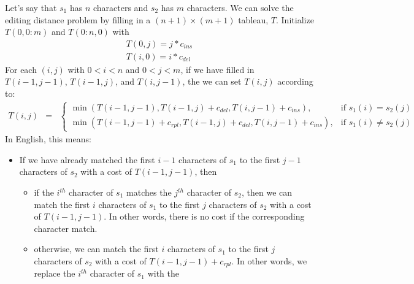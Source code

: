 \documentclass{article}
\begin{document}
\begin{enumerate}
          Let's say that $s_1$ has $n$ characters and $s_2$ has $m$ characters.
          We can solve the editing distance problem by filling in a $(n+1) \times (m+1)$ tableau, $T$.
          Initialize $T(0, 0:m)$ and $T(0:n, 0)$ with
          \begin{displaymath}\begin{array}{rcl}
                  T(0, j) = j*c_{ins} \\
                  T(i, 0) = i*c_{del}
              \end{array}\end{displaymath}
          For each $(i,j)$ with $0 < i < n$ and $0 < j < m$,
          if we have filled in $T(i-1, j-1)$, $T(i-1, j)$, and $T(i, j-1)$, the we can set $T(i,j)$ according to:
          \begin{displaymath}
              \begin{array}{rcl}
                  T(i,j) & = & \left\{\begin{array}{ll}
                                          \min(T(i-1, j-1), T(i-1, j) + c_{del}, T(i,j-1) + c_{ins}),           & \textrm{if $s_1(i) = s_2(j)$}    \\
                                          \min(T(i-1, j-1) + c_{rpl}, T(i-1, j) + c_{del}, T(i,j-1) + c_{ins}), & \textrm{if $s_1(i) \neq s_2(j)$}
                                      \end{array}\right.
              \end{array}
          \end{displaymath}
          In English, this means:
          \begin{itemize}
              \item If we have already matched the first $i-1$ characters of $s_1$ to the first $j-1$ characters of $s_2$
                    with a cost of $T(i-1, j-1)$, then
                    \begin{itemize}
                        \item if the $i^{th}$ character of $s_1$ matches the $j^{th}$ character of $s_2$,
                              then we can match the first $i$ characters of $s_1$ to the first $j$ characters of $s_2$ with a cost
                              of $T(i-1, j-1)$.  In other words, there is no cost if the corresponding character match.
                        \item otherwise,
                              we can match the first $i$ characters of $s_1$ to the first $j$ characters of $s_2$ with a cost
                              of $T(i-1, j-1) + c_{\mathit{rpl}}$.  In other words, we replace the $i^{th}$ character of $s_1$ with the

\end{itemize}
\end{itemize}
\end{enumerate}
\end{document}
